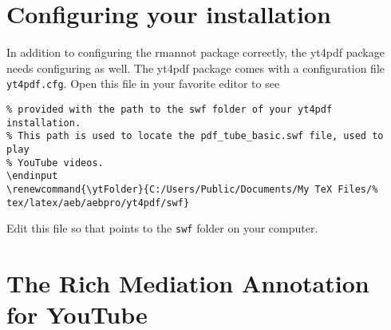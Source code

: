 \documentclass{article}
\newcommand{\YouTube}{\textsf{YouTube}}
\begin{document}
\section{Configuring your installation}

In addition to configuring the \textsf{rmannot} package correctly, the
\textsf{yt4pdf} package needs configuring as well. The \textsf{yt4pdf} package
comes with a configuration file \texttt{yt4pdf.cfg}.  Open this file in
your favorite editor to see
\begin{Verbatim}[fontsize=\small]
% yt4pdf config file. Delete the \endinput below and replace the path
% provided with the path to the swf folder of your yt4pdf installation.
% This path is used to locate the pdf_tube_basic.swf file, used to play
% YouTube videos.
\endinput
\renewcommand{\ytFolder}{C:/Users/Public/Documents/My TeX Files/%
tex/latex/aeb/aebpro/yt4pdf/swf}
\end{Verbatim}
Edit this file so that  points to the \texttt{swf} folder on
your computer.

\section{The Rich Mediation Annotation for {\YouTube}}
\end{document}
